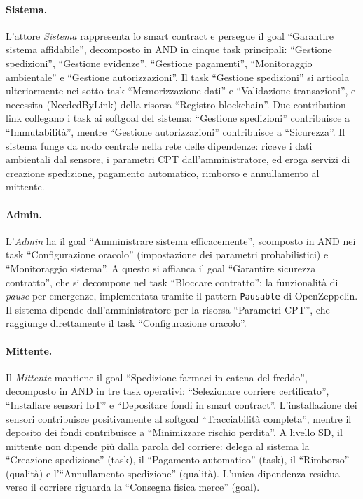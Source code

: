 \paragraph{Sistema.}
L'attore \textit{Sistema} rappresenta lo smart contract e persegue il goal ``Garantire sistema affidabile'', decomposto in AND in cinque task principali: ``Gestione spedizioni'', ``Gestione evidenze'', ``Gestione pagamenti'', ``Monitoraggio ambientale'' e ``Gestione autorizzazioni''. Il task ``Gestione spedizioni'' si articola ulteriormente nei sotto-task ``Memorizzazione dati'' e ``Validazione transazioni'', e necessita (NeededByLink) della risorsa ``Registro blockchain''. Due contribution link collegano i task ai softgoal del sistema: ``Gestione spedizioni'' contribuisce a ``Immutabilità'', mentre ``Gestione autorizzazioni'' contribuisce a ``Sicurezza''. Il sistema funge da nodo centrale nella rete delle dipendenze: riceve i dati ambientali dal sensore, i parametri CPT dall'amministratore, ed eroga servizi di creazione spedizione, pagamento automatico, rimborso e annullamento al mittente.

\paragraph{Admin.}
L'\textit{Admin} ha il goal ``Amministrare sistema efficacemente'', scomposto in AND nei task ``Configurazione oracolo'' (impostazione dei parametri probabilistici) e ``Monitoraggio sistema''. A questo si affianca il goal ``Garantire sicurezza contratto'', che si decompone nel task ``Bloccare contratto'': la funzionalità di \textit{pause} per emergenze, implementata tramite il pattern \texttt{Pausable} di OpenZeppelin. Il sistema dipende dall'amministratore per la risorsa ``Parametri CPT'', che raggiunge direttamente il task ``Configurazione oracolo''.

\paragraph{Mittente.}
Il \textit{Mittente} mantiene il goal ``Spedizione farmaci in catena del freddo'', decomposto in AND in tre task operativi: ``Selezionare corriere certificato'', ``Installare sensori IoT'' e ``Depositare fondi in smart contract''. L'installazione dei sensori contribuisce positivamente al softgoal ``Tracciabilità completa'', mentre il deposito dei fondi contribuisce a ``Minimizzare rischio perdita''. A livello SD, il mittente non dipende più dalla parola del corriere: delega al sistema la ``Creazione spedizione'' (task), il ``Pagamento automatico'' (task), il ``Rimborso'' (qualità) e l'``Annullamento spedizione'' (qualità). L'unica dipendenza residua verso il corriere riguarda la ``Consegna fisica merce'' (goal).

